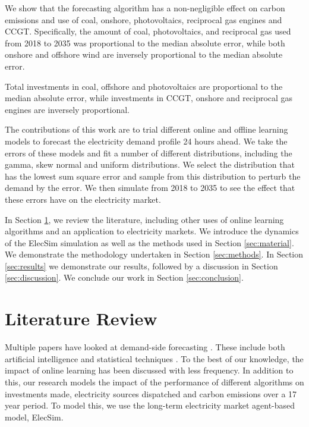 \documentclass[final,3p,times,twocolumn,numbers]{elsarticle}
\begin{document}
We show that the forecasting algorithm has a non-negligible effect on carbon emissions and use of coal, onshore, photovoltaics, reciprocal gas engines and CCGT. Specifically, the amount of coal, photovoltaics, and reciprocal gas used from 2018 to 2035 was proportional to the median absolute error, while both onshore and offshore wind are inversely proportional to the median absolute error.

Total investments in coal, offshore and photovoltaics are proportional to the median absolute error, while investments in CCGT, onshore and reciprocal gas engines are inversely proportional.



The contributions of this work are to trial different online and offline learning models to forecast the electricity demand profile 24 hours ahead. We take the errors of these models and fit a number of different distributions, including the gamma, skew normal and uniform distributions. We select the distribution that has the lowest sum square error and sample from this distribution to perturb the demand by the error. We then simulate from 2018 to 2035 to see the effect that these errors have on the electricity market.



In Section \ref{sec:lit-review}, we review the literature, including other uses of online learning algorithms and an application to electricity markets. We introduce the dynamics of the ElecSim simulation as well as the methods used in Section \ref{sec:material}. We demonstrate the methodology undertaken in Section \ref{sec:methods}. In Section \ref{sec:results} we demonstrate our results, followed by a discussion in Section \ref{sec:discussion}. We conclude our work in Section \ref{sec:conclusion}.

\section{Literature Review}
\label{sec:lit-review}

Multiple papers have looked at demand-side forecasting \cite{Singh2012}. These include both artificial intelligence \cite{Kim2000, Tiong2008,Quilumba2014} and statistical techniques \cite{Huang2003,Nguyen2017}. To the best of our knowledge, the impact of online learning has been discussed with less frequency. In addition to this, our research models the impact of the performance of different algorithms on investments made, electricity sources dispatched and carbon emissions over a 17 year period. To model this, we use the long-term electricity market agent-based model, ElecSim.
\end{document}
